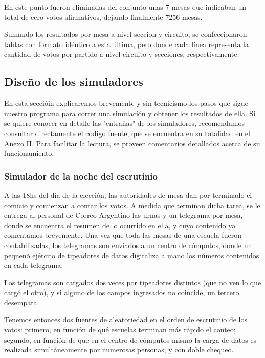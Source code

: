 \documentclass[12pt, a4paper]{article}
\begin{document}
En este punto fueron eliminadas del conjunto unas 7 mesas que indicaban un total de cero votos afirmativos, dejando finalmente 7256 mesas.

Sumando los resultados por mesa a nivel seccion y circuito, se confeccionaron tablas con formato id\'entico a esta \'ultima, pero donde cada l\'inea representa la cantidad de votos por partido a nivel circuito y secciones, respectivamente.

\subsection{Dise\~no de los simuladores}

En esta secci\'oin explicaremos brevemente y sin tecnicismo los pasos que sigue nuestro programa para correr una simulaci\'on y obtener los resultados de ella. 
Si se quiere conocer en detalle las "entra\~nas" de los simuladores, recomendamos consultar directamente el c\'odigo fuente, que se encuentra en su totalidad en el Anexo II. Para facilitar la lectura, se proveen comentarios detallados acerca de su funcionamiento.

\subsubsection{Simulador de la noche del escrutinio}

A las 18hs del d\'ia de la elecci\'on, las autoridades de mesa dan por terminado el comicio y comienzan a contar los votos. A medida que terminan dicha tarea, se le entrega al personal de Correo Argentino las urnas y un telegrama por mesa, donde se encuentra el resumen de lo ocurrido en ella, y cuyo contenido ya comentamos brevemente. Una vez que toda las mesas de una escuela fueron contabilizadas, los telegramas son enviados a un centro de c\'omputos, donde un pequen\~o ej\'ercito de tipeadores de datos digitaliza a mano los n\'umeros contenidos en cada telegrama.

Los telegramas son cargados dos veces por tipeadores distintos (que no ven lo que carg\'o el otro), y si alguno de los campos ingresados no coincide, un tercero desempata.

Tenemos entonces dos fuentes de aleatoriedad en el orden de escrutinio de los votos: primero, en funci\'on de qu\'e escuelas terminan m\'as r\'apido el conteo; segundo, en funci\'on de que en el centro de c\'omputos mismo la carga de datos es realizada simult\'aneamente por numerosas personas, y con doble chequeo.
\end{document}
